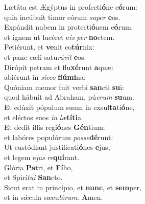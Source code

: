\oddverse Lætáta est Ægýptus in profecti\textbf{ó}ne e\textbf{ó}rum:~\*\\
\oddverse quia incúbuit timor eórum \textit{su}\textit{per} \textbf{e}os.\\
\evenverse Expándit nubem in protecti\textbf{ó}nem e\textbf{ó}rum:~\*\\
\evenverse et ignem ut lucéret e\textit{is} \textit{per} \textbf{no}ctem.\\
\oddverse Petiérunt, et \textbf{ve}nit co\textbf{túr}nix:~\*\\
\oddverse et pane cæli satu\textit{rá}\textit{vit} \textbf{e}os.\\
\evenverse Dirúpit petram et flu\textbf{xé}runt \textbf{a}quæ:~\*\\
\evenverse abiérunt in \textit{sic}\textit{co} \textbf{flú}\textbf{mi}na;\\
\oddverse Quóniam memor fuit verbi \textbf{san}cti \textbf{su}i:~\*\\
\oddverse quod hábuit ad Abraham, pú\textit{e}\textit{rum} \textbf{su}um.\\
\evenverse Et edúxit pópulum suum in exsul\textbf{ta}ti\textbf{ó}ne,~\*\\
\evenverse et eléctos suos \textit{in} \textit{læ}\textbf{tí}\textbf{ti}a.\\
\oddverse Et dedit illis regi\textbf{ó}nes \textbf{Gén}tium:~\*\\
\oddverse et labóres populórum \textit{pos}\textit{se}\textbf{dé}runt:\\
\evenverse Ut custódiant justificati\textbf{ó}nes \textbf{e}jus,~\*\\
\evenverse et legem e\textit{jus} \textit{re}\textbf{quí}rant.\\
\oddverse Glória \textbf{Pa}tri, et \textbf{Fí}lio,~\*\\
\oddverse et Spirí\textit{tu}\textit{i} \textbf{San}cto.\\
\evenverse Sicut erat in princípio, et \textbf{nunc}, et \textbf{sem}per,~\*\\
\evenverse et in sǽcula sæcu\textit{ló}\textit{rum}. \textbf{A}men.\\
